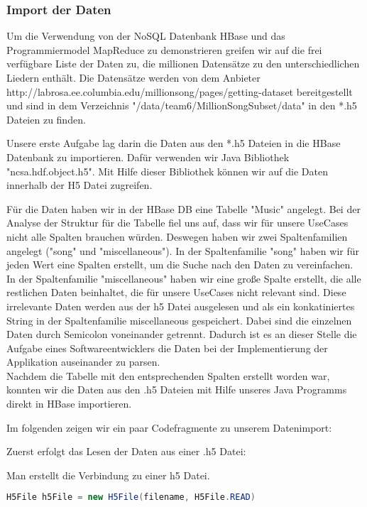 \subsubsection{Import der Daten}
Um die Verwendung von der NoSQL Datenbank HBase und das Programmiermodel MapReduce zu demonstrieren greifen wir auf die frei verfügbare Liste der Daten zu, die millionen Datensätze zu den unterschiedlichen Liedern enthält. Die Datensätze werden von dem Anbieter http://labrosa.ee.columbia.edu/millionsong/pages/getting-dataset bereitgestellt und  sind in dem Verzeichnis "/data/team6/MillionSongSubset/data" in den *.h5 Dateien zu finden. 

Unsere erste Aufgabe lag darin die Daten aus den *.h5 Dateien in die HBase Datenbank zu importieren.
Dafür verwenden wir Java Bibliothek "ncsa.hdf.object.h5". Mit Hilfe dieser Bibliothek können wir auf die Daten innerhalb der H5 Datei zugreifen.

Für die Daten haben wir in der HBase DB eine Tabelle "Music" angelegt. Bei der Analyse der Struktur für die Tabelle fiel uns auf, dass wir für unsere UseCases nicht alle Spalten brauchen würden. Deswegen haben wir zwei Spaltenfamilien angelegt ("song" und "miscellaneous"). In der Spaltenfamilie "song" haben wir für jeden Wert eine Spalten erstellt, um die Suche nach den Daten zu vereinfachen. In der Spaltenfamilie "miscellaneous" haben wir eine große Spalte erstellt, die alle restlichen Daten beinhaltet, die für unsere UseCases nicht relevant sind. Diese irrelevante Daten werden aus der h5 Datei ausgelesen und als ein konkatiniertes String in der Spaltenfamilie miscellaneous gespeichert. Dabei sind die einzelnen Daten durch Semicolon voneinander getrennt. Dadurch ist es an dieser Stelle die Aufgabe eines Softwareentwicklers die Daten bei der Implementierung der Applikation auseinander zu parsen.\\
Nachdem die Tabelle mit den entsprechenden Spalten erstellt worden war, konnten wir die Daten aus den .h5 Dateien mit Hilfe unseres Java Programms direkt in HBase importieren.

Im folgenden zeigen wir ein paar Codefragmente zu unserem Datenimport:

Zuerst erfolgt das Lesen der Daten aus einer .h5 Datei:

Man erstellt die Verbindung zu einer h5 Datei.
\begin{lstlisting}[language=Java]
H5File h5File = new H5File(filename, H5File.READ)
\end{lstlisting}

